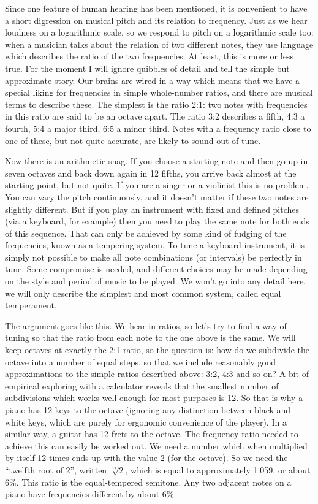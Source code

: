 

  Since one feature of human hearing has been mentioned, it is convenient to 
  have a short digression on musical pitch and its relation to frequency. Just 
  as we hear loudness on a logarithmic scale, so we respond to pitch on a 
  logarithmic scale too: when a musician talks about the relation of two 
  different notes, they use language which describes the ratio of the two 
  frequencies. At least, this is more or less true. For the moment I will 
  ignore quibbles of detail and tell the simple but approximate story. Our 
  brains are wired in a way which means that we have a special liking for 
  frequencies in simple whole-number ratios, and there are musical terms to 
  describe these. The simplest is the ratio 2:1: two notes with frequencies in 
  this ratio are said to be an octave apart. The ratio 3:2 describes a fifth, 
  4:3 a fourth, 5:4 a major third, 6:5 a minor third. Notes with a frequency 
  ratio close to one of these, but not quite accurate, are likely to sound out 
  of tune. 

  Now there is an arithmetic snag. If you choose a starting note and then go up 
  in seven octaves and back down again in 12 fifths, you arrive back almost at 
  the starting point, but not quite. If you are a singer or a violinist this is 
  no problem. You can vary the pitch continuously, and it doesn't matter if 
  these two notes are slightly different. But if you play an instrument with 
  fixed and defined pitches (via a keyboard, for example) then you need to play 
  the same note for both ends of this sequence. That can only be achieved by 
  some kind of fudging of the frequencies, known as a tempering system. To tune 
  a keyboard instrument, it is simply not possible to make all note 
  combinations (or intervals) be perfectly in tune. Some compromise is needed, 
  and different choices may be made depending on the style and period of music 
  to be played. We won't go into any detail here, we will only describe the 
  simplest and most common system, called equal temperament. 

  The argument goes like this. We hear in ratios, so let's try to find a way of 
  tuning so that the ratio from each note to the one above is the same. We will 
  keep octaves at exactly the 2:1 ratio, so the question is: how do we 
  subdivide the octave into a number of equal steps, so that we include 
  reasonably good approximations to the simple ratios described above: 3:2, 4:3 
  and so on? A bit of empirical exploring with a calculator reveals that the 
  smallest number of subdivisions which works well enough for most purposes is 
  12. So that is why a piano has 12 keys to the octave (ignoring any 
  distinction between black and white keys, which are purely for ergonomic 
  convenience of the player). In a similar way, a guitar has 12 frets to the 
  octave. The frequency ratio needed to achieve this can easily be worked out. 
  We need a number which when multiplied by itself 12 times ends up with the 
  value 2 (for the octave). So we need the ``twelfth root of 2'', written 
  $\sqrt[12]{2}$, which is equal to approximately 1.059, or about 6\%. This 
  ratio is the equal-tempered semitone. Any two adjacent notes on a piano have 
  frequencies different by about 6\%. 

